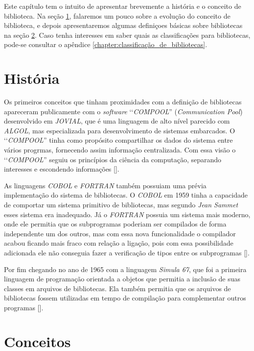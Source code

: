 Este capítulo tem o intuito de apresentar brevemente a história e o conceito de biblioteca. Na seção
\ref{section:historia_biblioteca}, falaremos um pouco sobre a evolução do conceito de biblioteca, e
depois apresentaremos algumas definiçoes básicas sobre bibliotecas na seção \ref{section:conceitos}.
Caso tenha interesses em saber quais as classificações para bibliotecas, pode-se consultar o
apêndice \ref{chapter:classificação_de_bibliotecas}.

\section{História}
\label{section:historia_biblioteca}

Os primeiros conceitos que tinham proximidades com a definição de bibliotecas apareceram publicamente
com o \emph{software} ‘‘\emph{COMPOOL}'' (\emph{Communication Pool}) desenvolvido em \emph{JOVIAL},
que é uma linguagem de alto nível parecido com \emph{ALGOL}, mas especializada para desenvolvimento
de sistemas embarcados. O ‘‘\emph{COMPOOL}'' tinha como propósito compartilhar os dados do
sistema entre vários progrmas, fornecendo assim informação centralizada. Com essa visão o
‘‘\emph{COMPOOL}'' seguiu os princípios da ciência da computação, separando interesses e
escondendo informações [].

As linguagens \emph{COBOL} e \emph{FORTRAN} também possuiam uma prévia implementação do sistema de
bibliotecas. O \emph{COBOL} em 1959 tinha a capacidade de comportar um sistema primitivo de
bibliotecas, mas segundo \emph{Jean Sammet} esses sistema era inadequado. Já o
\emph{FORTRAN} possuia um sistema mais moderno, onde ele permitia que os subprogramas poderiam ser
compilados de forma independente um dos outros, mas com essa nova funcionalidade o compilador acabou
ficando mais fraco com relação a ligação, pois com essa possibilidade adicionada ele não conseguia
fazer a verificação de tipos entre os subprogramas [].

Por fim chegando no ano de 1965 com a linguagem \emph{Simula 67}, que foi a primeira linguagem
de programação orientada a objetos que permitia a inclusão de suas classes em arquivos de bibliotecas.
Ela também permitia que os arquivos de bibliotecas fossem utilizadas em tempo de compilação para
complementar outros programas [].

\section{Conceitos}
\label{section:conceitos}

